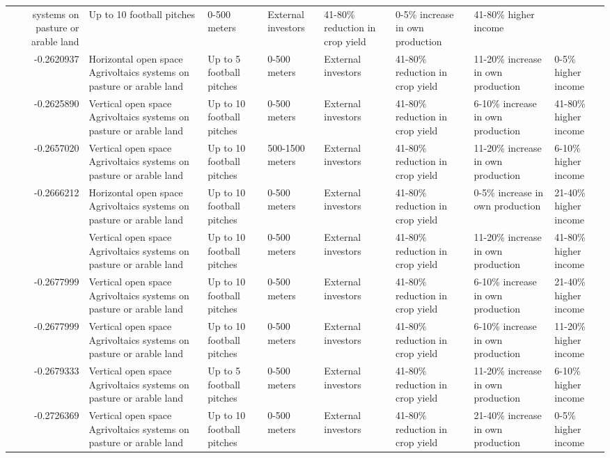 \begin{table}
\begin{tabular}[t]{rlllllll}
systems on pasture or arable land & Up to 10 football pitches & 0-500 meters & External investors & 41-80\% reduction in crop yield & 0-5\% increase in own production & 41-80\% higher income\\
-0.2620937 & Horizontal open space Agrivoltaics
systems on pasture or arable land & Up to 5 football pitches & 0-500 meters & External investors & 41-80\% reduction in crop yield & 11-20\% increase in own production & 0-5\% higher income\\
-0.2625890 & Vertical open space Agrivoltaics
systems on pasture or arable land & Up to 10 football pitches & 0-500 meters & External investors & 41-80\% reduction in crop yield & 6-10\% increase in own production & 41-80\% higher income\\
-0.2657020 & Vertical open space Agrivoltaics
systems on pasture or arable land & Up to 10 football pitches & 500-1500 meters & External investors & 41-80\% reduction in crop yield & 11-20\% increase in own production & 6-10\% higher income\\
-0.2666212 & Horizontal open space Agrivoltaics
systems on pasture or arable land & Up to 10 football pitches & 0-500 meters & External investors & 41-80\% reduction in crop yield & 0-5\% increase in own production & 21-40\% higher income\\
\addlinespace
-0.2676914 & Vertical open space Agrivoltaics
systems on pasture or arable land & Up to 10 football pitches & 0-500 meters & External investors & 41-80\% reduction in crop yield & 11-20\% increase in own production & 41-80\% higher income\\
-0.2677999 & Vertical open space Agrivoltaics
systems on pasture or arable land & Up to 10 football pitches & 0-500 meters & External investors & 41-80\% reduction in crop yield & 6-10\% increase in own production & 21-40\% higher income\\
-0.2677999 & Vertical open space Agrivoltaics
systems on pasture or arable land & Up to 10 football pitches & 0-500 meters & External investors & 41-80\% reduction in crop yield & 6-10\% increase in own production & 11-20\% higher income\\
-0.2679333 & Vertical open space Agrivoltaics
systems on pasture or arable land & Up to 5 football pitches & 0-500 meters & External investors & 41-80\% reduction in crop yield & 11-20\% increase in own production & 6-10\% higher income\\
-0.2726369 & Vertical open space Agrivoltaics
systems on pasture or arable land & Up to 10 football pitches & 0-500 meters & External investors & 41-80\% reduction in crop yield & 21-40\% increase in own production & 0-5\% higher income\\

\end{tabular}
\end{table}
